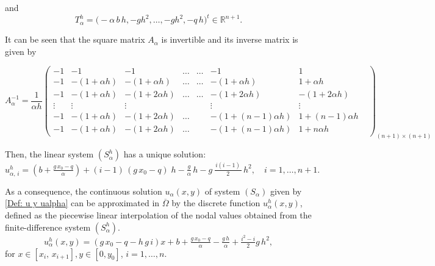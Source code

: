 \documentclass[axioms,article,submit,moreauthors]{Definitions/mdpi}
\begin{document}
  \noindent and \begin{equation}\label{Talpha}
  {T^h_\alpha}= \Big(-\alpha\,b\,h, -g h^2, \ldots, -g h^2, -q\,h  \Big)^t \in  \mathbb{R}^{n+1}.
  \end{equation}
     
 \noindent It can be seen that the square matrix $A_{\alpha}$ is invertible  and its inverse matrix is given by
 
 
\begin{scriptsize}
\[A_{\alpha}^{-1}=\frac{1}{\alpha h}\begin{pmatrix}
-1 & -1 & -1 & \ldots & \ldots & -1 & 1 &\\                                                                                                   
-1 & -(1+\alpha h) & -(1+\alpha h) & \ldots & \ldots & -(1+\alpha h) & 1+\alpha h &\\                                                                                                   
-1 & -(1+\alpha h) & -(1+2\alpha h) & \ldots & \ldots &-(1+2\alpha h) & -(1+2\alpha h) &\\                                                                                                   
\vdots & \vdots & \vdots  &&& \vdots  & \vdots\\
-1& -(1+\alpha h)& -(1+2\alpha h) &\ldots && -(1+(n-1)\alpha h) & 1+(n-1)\alpha h\\
 -1 & -(1+\alpha h)& -(1+2\alpha h)& \ldots &  &-(1+(n-1)\alpha h) &1+n\alpha h
\end{pmatrix}_{(n+1)\times (n+1)}\] 
\end{scriptsize}
 
 
 
Then, the linear system ${(S^h_{\alpha})}$ has a unique solution:
\[ {u^h_{\alpha,\,i}} = (b + \tfrac{g\,x_0 - q}{\alpha}) + (i-1)  \,(g\,x_0-q)\; h - \tfrac{g}{\alpha}\,h  -   g \, \tfrac{\,i(i-1)\,}{2}\,h^2,\quad i=1, \ldots, n+1. \]
      
 {As a consequence, the continuous solution $u_{\alpha}(x, y)$ of system $(S_\alpha)$ given by \eqref{Def: u y ualpha} can be approximated in $\overline{\Omega}$ by the discrete function $u^h_{\alpha}(x, y)$, defined as the piecewise linear interpolation of the nodal values obtained from the finite-difference system $(S^h_{\alpha})$.
}
 \begin{equation}\label{ec 2.3}
     	   { u^h_{\alpha}} (x, y) = ( g\, x_0 - q - h\, g\, i) x + 
     	    b +  \tfrac{g\,x_0 - q}{\alpha} -  \tfrac{g\,h}{\alpha} +  \tfrac{i^2-i}{2} g\,h^2 ,
           \end{equation}
     	for $x \in [x_i, \,x_{i+1}], y\in [0, y_0]$, $i=1, \ldots , n.$
\end{document}
